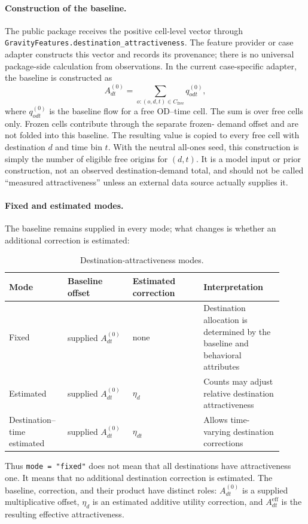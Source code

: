 \paragraph{Construction of the baseline.}
The public package receives the positive cell-level vector through
\texttt{GravityFeatures.destination\_attractiveness}.  The feature provider or
case adapter constructs this vector and records its provenance; there is no
universal package-side calculation from observations.  In the current
case-specific adapter, the baseline is constructed as
\begin{equation}
    A^{(0)}_{dt}
      = \sum_{o:(o,d,t)\in C_{\mathrm{free}}}q^{(0)}_{odt},
\end{equation}
where $q^{(0)}_{odt}$ is the baseline flow for a free OD--time cell.  The sum
is over free cells only.  Frozen cells contribute through the separate frozen-
demand offset and are not folded into this baseline.  The resulting value is
copied to every free cell with destination $d$ and time bin $t$.  With the
neutral all-ones seed, this construction is simply the number of eligible free
origins for $(d,t)$.  It is a model input or prior construction, not an
observed destination-demand total, and should not be called ``measured
attractiveness'' unless an external data source actually supplies it.

\paragraph{Fixed and estimated modes.}
The baseline remains supplied in every mode; what changes is whether an
additional correction is estimated:
\begin{table}[htbp]
\centering\small
\setlength{\tabcolsep}{4pt}
\begin{tabular}{p{0.18\linewidth}p{0.22\linewidth}p{0.24\linewidth}p{0.27\linewidth}}
\hline
Mode & Baseline offset & Estimated correction & Interpretation\\
\hline
Fixed & supplied $A^{(0)}_{dt}$ & none & Destination allocation is determined by the baseline and behavioral attributes\\
Estimated & supplied $A^{(0)}_{dt}$ & $\eta_d$ & Counts may adjust relative destination attractiveness\\
Destination--time estimated & supplied $A^{(0)}_{dt}$ & $\eta_{dt}$ & Allows time-varying destination corrections\\
\hline
\end{tabular}
\caption{Destination-attractiveness modes.}
\end{table}
Thus \texttt{mode = "fixed"} does not mean that all destinations have
attractiveness one.  It means that no additional destination correction is
estimated.  The baseline, correction, and their product have distinct roles:
$A^{(0)}_{dt}$ is a supplied multiplicative offset, $\eta_d$ is an estimated
additive utility correction, and $A^{\mathrm{eff}}_{dt}$ is the resulting
effective attractiveness.

